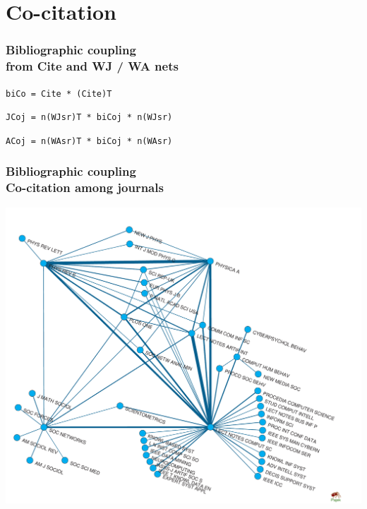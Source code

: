 \documentclass[hyperref={pdfstartview={FitBH -32768},
                         pdfpagemode=FullScreen,
                         plainpages=false,
                         colorlinks=true}
              ]{beamer}
\begin{document}
\section{Co-citation}  

\begin{frame}[fragile]
\frametitle{Bibliographic coupling \\ \normalsize from Cite and WJ / WA nets}

\texttt{biCo = Cite * (Cite)T} \medskip

\texttt{JCoj = n(WJsr)T * biCoj * n(WJsr)} \medskip

\texttt{ACoj = n(WAsr)T * biCoj * n(WAsr)} 

\end{frame}

\begin{frame}[fragile]
\frametitle{Bibliographic coupling \\ \normalsize Co-citation among journals}

\begin{center}
\includegraphics[width=\textheight]{JacJou.pdf}
\end{center}

\end{frame}
\end{document}
